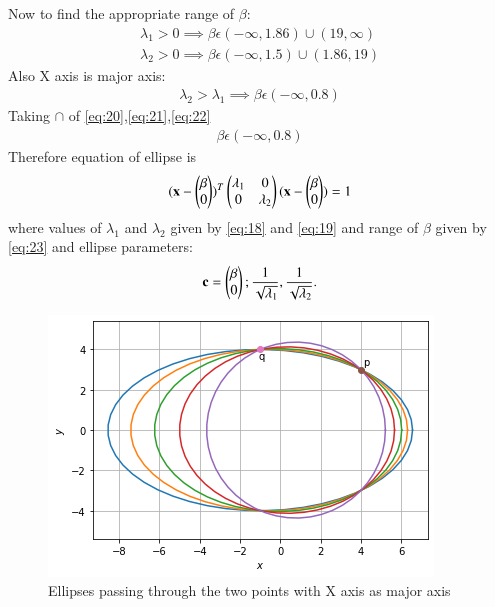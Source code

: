 \documentclass[journal,12pt,twocolumn]{IEEEtran}
\begin{document}
Now to find the appropriate range of $\beta$:
\begin{align}
\lambda_1 >0
\implies \beta\epsilon(-\infty,1.86)\cup(19,\infty)\label{eq:20}\\
\lambda_2 >0
\implies \beta\epsilon(-\infty,1.5)\cup(1.86,19)\label{eq:21}
\end{align}
Also X axis is major axis:
\begin{align}
    \lambda_2>\lambda_1
    \implies\beta\epsilon(-\infty,0.8)\label{eq:22}
\end{align}
Taking $\cap$ of \eqref{eq:20},\eqref{eq:21},\eqref{eq:22}
\begin{align}
  \beta\epsilon(-\infty,0.8) \label{eq:23} 
\end{align}
Therefore equation of ellipse is
\begin{align}
(\mathbf{x}-\begin{pmatrix}\beta\\0\end{pmatrix})^T\begin{pmatrix}\lambda_1&0\\0&\lambda_2\end{pmatrix}(\mathbf{x}-\begin{pmatrix}\beta\\0\end{pmatrix})=1
\end{align}
where values of $\lambda_1$ and $\lambda_2$ given by \eqref{eq:18} and \eqref{eq:19} and range of $\beta$ given by \eqref{eq:23} and ellipse parameters:
\begin{align}
\mathbf{c} = \begin{pmatrix}\beta\\0\end{pmatrix};
\frac{1}{\sqrt{\lambda_1}},
\frac{1}{\sqrt{\lambda_2}}.
\end{align}
\begin{figure}[!ht]
\centering
\includegraphics[width=\columnwidth]{figure5_1}
\caption{Ellipses passing through the two points with X axis as major axis}
\label{fig:ellipses}	
\end{figure}
\end{document}
